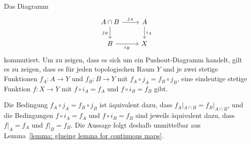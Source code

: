Das Diagramm
\[
  \begin{tikzcd}
      A \cap B
      \arrow{r}{j_A}
      \arrow[swap]{d}{j_B}
    & A
      \arrow{d}{i_A}
    \\
      B
      \arrow[swap]{r}{i_B}
    & X
  \end{tikzcd}
\]
kommutiert.
Um zu zeigen, dass es sich um ein Pushout-Diagramm handelt, gilt es zu zeigen, dass es für jeden topologischen Raum $Y$ und je zwei stetige Funktionen $f_A \colon A \to Y$ und $f_B \colon B \to Y$ mit $f_A \circ j_A = f_B \circ j_B$, eine eindeutige stetige Funktion $f \colon X \to Y$ mit $f \circ i_A = f_A$ und $f \circ i_B = f_B$ gibt.

Die Bedingung $f_A \circ j_A = f_B \circ j_B$ ist äquivalent dazu, dass $f_A|_{A \cap B} = f_B|_{A \cap B}$, und die Bedingungen $f \circ i_A = f_A$ und $f \circ i_B = f_B$ sind jeweils äquivalent dazu, dass $f|_A = f_A$ und $f|_B = f_B$.
Die Aussage folgt deshalb unmittelbar aus Lemma~\ref{lemma: glueing lemma for continuous maps}.
